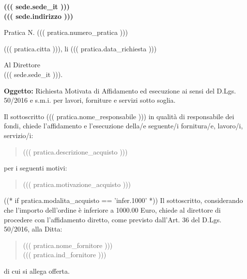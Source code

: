 \documentclass[a4paper,12pt]{letter}
\begin{document}
\vspace{-2.5cm}
\begin{center}
\small \bf
((( sede.sede_it ))) \\
((( sede.indirizzo )))
\end{center}
\thispagestyle{empty}
\vspace{1cm}

{\small Pratica N. ((( pratica.numero_pratica ))) }
\vspace{1cm}

\begin{flushright}
((( pratica.citta ))), li ((( pratica.data_richiesta ))) 
\end{flushright}
\vspace{1cm}

Al Direttore \\
((( sede.sede_it ))).
\vspace{0.5cm}
	 
{\bf Oggetto:} Richiesta Motivata di Affidamento ed esecuzione ai sensi del D.Lgs. 50/2016 e s.m.i.
per lavori, forniture e servizi sotto soglia.

\vspace{0.5cm}

Il sottoscritto ((( pratica.nome_responsabile ))) in qualit\`a di 
responsabile dei fondi, chiede l'affidamento e l'esecuzione della/e
seguente/i fornitura/e, lavoro/i, servizio/i:

\begin{quote}

((( pratica.descrizione_acquisto )))
\end{quote}

per i seguenti motivi:

\begin{quote}
((( pratica.motivazione_acquisto )))
\end{quote}

((* if pratica.modalita_acquisto == 'infer.1000' *))
Il sottoscritto, considerando che l'importo dell'ordine \`e inferiore a 1000.00 Euro,
chiede al direttore di procedere con l'affidamento diretto,
come previsto dall'Art. 36 del D.Lgs. 50/2016, alla Ditta: 
\begin{quote}
((( pratica.nome_fornitore )))\\
((( pratica.ind_fornitore )))
\end{quote}

di cui si allega offerta.
\end{document}
